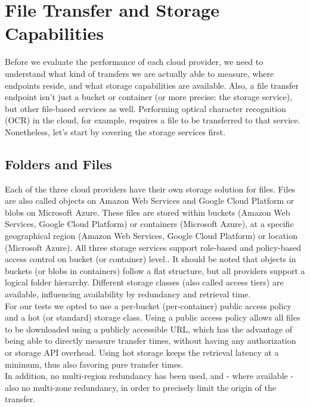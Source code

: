 \documentclass[a4paper,bibliography=totoc]{scrartcl}
\newcommand{\Azure}{Microsoft Azure\xspace}
\newcommand{\GCP}{Google Cloud Platform\xspace}
\newcommand{\AWS}{Amazon Web Services\xspace}
\begin{document}
\section{File Transfer and Storage Capabilities}
Before we evaluate the performance of each cloud provider, we need to understand what kind of transfers we are actually able to measure, where endpoints reside, and what storage capabilities are available. Also, a file transfer endpoint isn't just a bucket or container (or more precise: the storage service), but other file-based services as well. Performing optical character recognition (OCR) in the cloud, for example, requires a file to be transferred to that service.\cite{aws_rekognition,azure_ocr,gcp_annotate}\\
Nonetheless, let's start by covering the storage services first.

\subsection{Folders and Files}\label{sec:files_and_folders}
Each of the three cloud providers have their own storage solution for files. Files are also called objects on \AWS\cite{aws_s3_objects} and \GCP\cite{gcp_storage_objects} or blobs on \Azure\cite{azure_blob_storage}. These files are stored within buckets (\AWS, \GCP) or containers (\Azure), at a specific geographical region (\AWS, \GCP) or location (\Azure). All three storage services support role-based and policy-based access control on bucket (or container) level.\cite{aws_s3_security,azure_storage_security,gcp_storage_security}. It should be noted that objects in buckets (or blobs in containers) follow a flat structure, but all providers support a logical folder hierarchy.\cite{aws_s3_folders,gcp_storage_buckets} Different storage classes (also called access tiers) are available, influencing availability by redundancy and retrieval time.\cite{aws_s3_classes,azure_storage_tiers,gcp_storage_classes}\\
For our tests we opted to use a per-bucket (per-container) public access policy and a hot (or standard) storage class. Using a public access policy allows all files to be downloaded using a publicly accessible URL, which has the advantage of being able to directly measure transfer times, without having any authorization or storage API overhead. Using hot storage keeps the retrieval latency at a minimum, thus also favoring pure transfer times.\\
In addition, no multi-region redundancy has been used, and - where available - also no multi-zone redundancy, in order to precisely limit the origin of the transfer.
\end{document}
